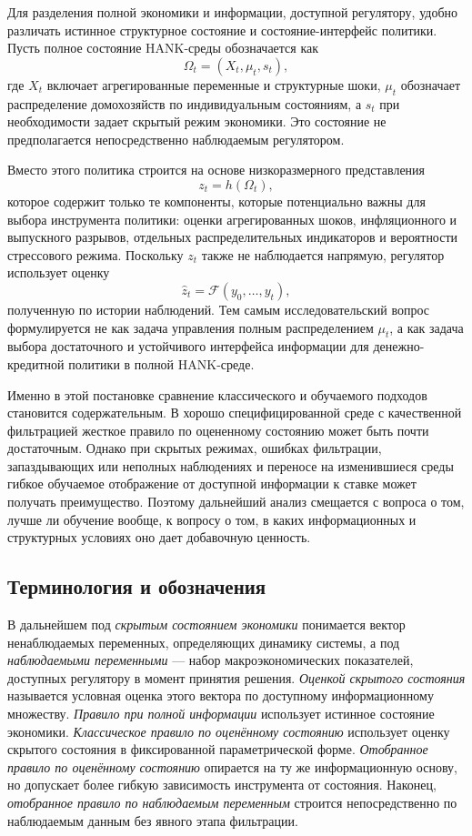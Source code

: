 \documentclass[12pt,a4paper]{article}
\begin{document}
Для разделения полной экономики и информации, доступной регулятору, удобно различать истинное структурное состояние и состояние-интерфейс политики. Пусть полное состояние HANK-среды обозначается как
\[
\Omega_t = (X_t,\mu_t,s_t),
\]
где $X_t$ включает агрегированные переменные и структурные шоки, $\mu_t$ обозначает распределение домохозяйств по индивидуальным состояниям, а $s_t$ при необходимости задает скрытый режим экономики. Это состояние не предполагается непосредственно наблюдаемым регулятором.

Вместо этого политика строится на основе низкоразмерного представления
\[
z_t = h(\Omega_t),
\]
которое содержит только те компоненты, которые потенциально важны для выбора инструмента политики: оценки агрегированных шоков, инфляционного и выпускного разрывов, отдельных распределительных индикаторов и вероятности стрессового режима. Поскольку $z_t$ также не наблюдается напрямую, регулятор использует оценку
\[
\widehat z_t = \mathcal{F}(y_0,\ldots,y_t),
\]
полученную по истории наблюдений. Тем самым исследовательский вопрос формулируется не как задача управления полным распределением $\mu_t$, а как задача выбора достаточного и устойчивого интерфейса информации для денежно-кредитной политики в полной HANK-среде.

Именно в этой постановке сравнение классического и обучаемого подходов становится содержательным. В хорошо специфицированной среде с качественной фильтрацией жесткое правило по оцененному состоянию может быть почти достаточным. Однако при скрытых режимах, ошибках фильтрации, запаздывающих или неполных наблюдениях и переносе на изменившиеся среды гибкое обучаемое отображение от доступной информации к ставке может получать преимущество. Поэтому дальнейший анализ смещается с вопроса о том, лучше ли обучение вообще, к вопросу о том, в каких информационных и структурных условиях оно дает добавочную ценность.

\subsection{Терминология и обозначения}

В дальнейшем под \textit{скрытым состоянием экономики} понимается вектор ненаблюдаемых переменных, определяющих динамику системы, а под \textit{наблюдаемыми переменными} --- набор макроэкономических показателей, доступных регулятору в момент принятия решения. \textit{Оценкой скрытого состояния} называется условная оценка этого вектора по доступному информационному множеству. \textit{Правило при полной информации} использует истинное состояние экономики. \textit{Классическое правило по оценённому состоянию} использует оценку скрытого состояния в фиксированной параметрической форме. \textit{Отобранное правило по оценённому состоянию} опирается на ту же информационную основу, но допускает более гибкую зависимость инструмента от состояния. Наконец, \textit{отобранное правило по наблюдаемым переменным} строится непосредственно по наблюдаемым данным без явного этапа фильтрации.
\end{document}
